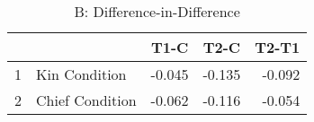 \begin{table}[ht]
\centering
\caption{B: Difference-in-Difference} 
\begin{tabular}{rlrrr}
  \hline
 &  & T1-C & T2-C & T2-T1 \\ 
  \hline
1 & Kin Condition & -0.045 & -0.135 & -0.092 \\ 
  2 & Chief Condition & -0.062 & -0.116 & -0.054 \\ 
   \hline
\end{tabular}
\end{table}
